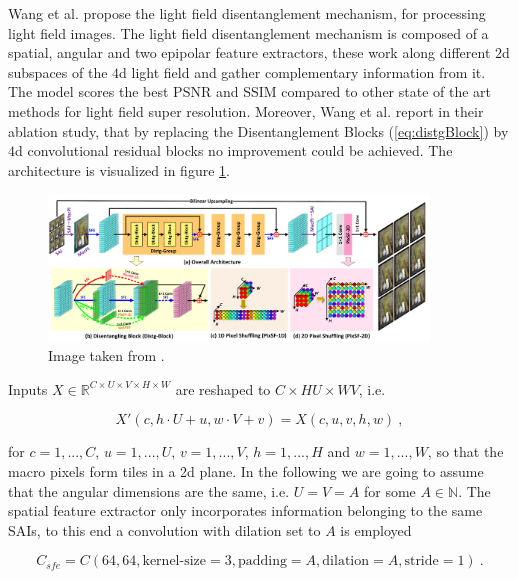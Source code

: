 Wang et al. \cite{wangDisentanglingLightFields2023} propose the light field disentanglement mechanism,
for processing light field images.
The light field disentanglement mechanism is composed of a spatial, angular and two epipolar feature extractors,
these work along different $2$d subspaces of the $4$d light field and gather complementary information from it.
The model scores the best PSNR and SSIM compared to other state of the art methods for light field super resolution.
Moreover, Wang et al. \cite{wangDisentanglingLightFields2023} report in their ablation study,
that by replacing the Disentanglement Blocks (\ref{eq:distgBlock}) 
by $4$d convolutional residual blocks no improvement could be achieved.
The architecture is visualized in figure \ref{fig:distg}.

\begin{figure}[h!]
    \includegraphics[width=0.9\textwidth]{models/lfsr/imgs/distg.png}
    \caption{Image taken from \cite{wangDisentanglingLightFields2023}.}
    \label{fig:distg}
\end{figure}

Inputs $X \in \mathbb R^{C \times U \times V \times H \times W}$ are reshaped to $C \times HU \times WV$, i.e.

    \begin{equation}
        \label{eq:macpiplane}
        X'(c, h\cdot U + u, w \cdot V + v) = X(c, u, v, h, w) ~, 
    \end{equation}

for $c = 1, ..., C$, $u = 1, ..., U$, $v = 1, ..., V$, $h = 1, ..., H$ and $w = 1, ..., W$,
so that the macro pixels form tiles in a 2d plane.
In the following we are going to assume that the angular dimensions are the same,
i.e. $U = V = A$ for some $A \in \mathbb N$.
The spatial feature extractor only incorporates information belonging to the same SAIs,
to this end a convolution with dilation set to $A$ is employed

\begin{equation}
    \label{eq:sfe}
    C_{sfe} = C(64, 64, \text{kernel-size}=3, \text{padding}=A, \text{dilation}=A, \text{stride}=1) ~.
\end{equation}

